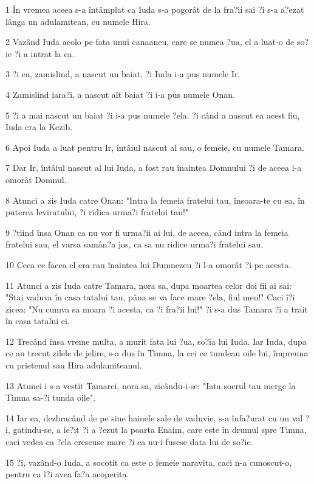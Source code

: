 \par 1 În vremea aceea s-a întâmplat ca Iuda s-a pogorât de la fra?ii sai ?i s-a a?ezat lânga un adulamitean, cu numele Hira.
\par 2 Vazând Iuda acolo pe fata unui canaaneu, care se numea ?ua, el a luat-o de so?ie ?i a intrat la ea.
\par 3 ?i ea, zamislind, a nascut un baiat, ?i Iuda i-a pus numele Ir.
\par 4 Zamislind iara?i, a nascut alt baiat ?i i-a pus numele Onan.
\par 5 ?i a mai nascut un baiat ?i i-a pus numele ?ela. ?i când a nascut ea acest fiu, Iuda era la Kezib.
\par 6 Apoi Iuda a luat pentru Ir, întâiul nascut al sau, o femeie, cu numele Tamara.
\par 7 Dar Ir, întâiul nascut al lui Iuda, a fost rau înaintea Domnului ?i de aceea l-a omorât Domnul.
\par 8 Atunci a zis Iuda catre Onan: "Intra la femeia fratelui tau, însoara-te cu ea, în puterea leviratului, ?i ridica urma?i fratelui tau!"
\par 9 ?tiind însa Onan ca nu vor fi urma?ii ai lui, de aceea, când intra la femeia fratelui sau, el varsa samân?a jos, ca sa nu ridice urma?i fratelui sau.
\par 10 Ceea ce facea el era rau înaintea lui Dumnezeu ?i l-a omorât ?i pe acesta.
\par 11 Atunci a zis Iuda catre Tamara, nora sa, dupa moartea celor doi fii ai sai: "Stai vaduva în casa tatalui tau, pâna se va face mare ?ela, fiul meu!" Caci î?i zicea: "Nu cumva sa moara ?i acesta, ca ?i fra?ii lui!" ?i s-a dus Tamara ?i a trait în casa tatalui ei.
\par 12 Trecând însa vreme multa, a murit fata lui ?ua, so?ia lui Iuda. Iar Iuda, dupa ce au trecut zilele de jelire, s-a dus în Timna, la cei ce tundeau oile lui, împreuna cu prietenul sau Hira adulamiteanul.
\par 13 Atunci i s-a vestit Tamarei, nora sa, zicându-i-se: "Iata socrul tau merge la Timna sa-?i tunda oile".
\par 14 Iar ea, dezbracând de pe sine hainele sale de vaduvie, s-a înfa?urat cu un val ?i, gatindu-se, a ie?it ?i a ?ezut la poarta Enaim, care este în drumul spre Timna, caci vedea ca ?ela crescuse mare ?i ea nu-i fusese data lui de so?ie.
\par 15 ?i, vazând-o Iuda, a socotit ca este o femeie naravita, caci n-a cunoscut-o, pentru ca î?i avea fa?a acoperita.
